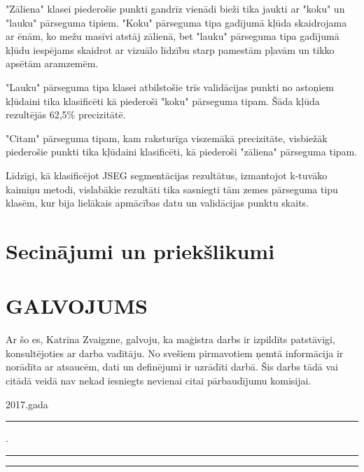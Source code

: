 \documentclass[12pt,paper=a4]{report}
\begin{document}
"Zāliena" klasei piederošie punkti gandrīz vienādi bieži tika jaukti ar "koku" un "lauku" pārseguma tipiem. "Koku" pārseguma tipa gadījumā kļūda skaidrojama ar ēnām, ko mežu masīvi atstāj zālienā, bet "lauku" pārseguma tipa gadījumā kļūdu iespējams skaidrot ar vizuālo līdzību starp pamestām pļavām un tikko apsētām aramzemēm. \par
"Lauku" pārseguma tipa klasei atbilstošie trīs validācijas punkti no astoņiem kļūdaini tika klasificēti kā piederoši "koku" pārseguma tipam. Šāda kļūda rezultējās 62,5\% precizitātē.\par
"Citam" pārseguma tipam, kam raksturīga viszemākā precizitāte, visbiežāk piederošie punkti tika kļūdaini klasificēti, kā piederoši "zāliena" pārseguma tipam.\par
Līdzīgi, kā klasificējot JSEG segmentācijas rezultātus, izmantojot k-tuvāko kaimiņu metodi, vislabākie rezultāti tika sasniegti tām zemes pārseguma tipu klasēm, kur bija lielākais apmācības datu un validācijas punktu skaits.
\chapter*{Secinājumi un priekšlikumi}
{}


\chapter*{GALVOJUMS}
\vspace{60pt}
Ar šo es, Katrīna Zvaigzne, galvoju, ka maģistra darbs ir izpildīts patstāvīgi, konsultējoties ar darba vadītāju. No svešiem pirmavotiem ņemtā informācija ir norādīta ar atsaucēm, dati un definējumi ir uzrādīti darbā. Šis darbs tādā vai citādā veidā nav nekad iesniegts nevienai citai pārbaudījumu komisijai. 

\vspace{60pt}
\vspace{1in}

2017.gada \rule{1cm}{0.2pt}.\rule{3cm}{0.2pt} \hspace{3cm}\rule{5cm}{0.2pt}

\label{LastPage}
\end{document}
